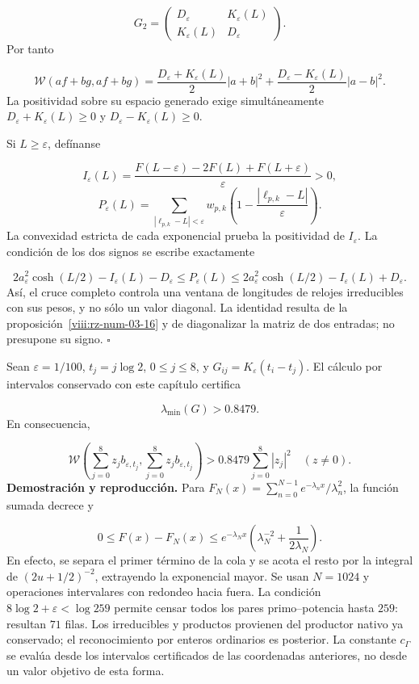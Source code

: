 \[
G_2=\begin{pmatrix}D_\varepsilon&K_\varepsilon(L)\\
K_\varepsilon(L)&D_\varepsilon\end{pmatrix}.
\]
Por tanto

\[
\mathscr W(af+bg,af+bg)=
\frac{D_\varepsilon+K_\varepsilon(L)}2|a+b|^2
+\frac{D_\varepsilon-K_\varepsilon(L)}2|a-b|^2.
\]
La positividad sobre su espacio generado exige simultáneamente \(D_\varepsilon+K_\varepsilon(L)\geq0\) y \(D_\varepsilon-K_\varepsilon(L)\geq0\).

Si \(L\geq\varepsilon\), defínanse

\[
I_\varepsilon(L)=
\frac{F(L-\varepsilon)-2F(L)+F(L+\varepsilon)}{\varepsilon}>0,
\]
\[
P_\varepsilon(L)=
\sum_{|\ell_{p,k}-L|<\varepsilon}w_{p,k}
\left(1-\frac{|\ell_{p,k}-L|}{\varepsilon}\right).
\]
La convexidad estricta de cada exponencial prueba la positividad de \(I_\varepsilon\). La condición de los dos signos se escribe exactamente

\[
2a_\varepsilon^2\cosh(L/2)-I_\varepsilon(L)-D_\varepsilon
\leq P_\varepsilon(L)
\leq
2a_\varepsilon^2\cosh(L/2)-I_\varepsilon(L)+D_\varepsilon.
\]
Así, el cruce completo controla una ventana de longitudes de relojes irreducibles con sus pesos, y no sólo un valor diagonal. La identidad resulta de la proposición~\ref{viii:rz-num-03-16} y de diagonalizar la matriz de dos entradas; no presupone su signo. \hfill\(\square\)

Sean \(\varepsilon=1/100\), \(t_j=j\log2\), \(0\leq j\leq8\), y \(G_{ij}=K_\varepsilon(t_i-t_j)\). El cálculo por intervalos conservado con este capítulo certifica

\[
\lambda_{\min}(G)>0.8479.
\]
En consecuencia,

\[
\mathscr W\left(\sum_{j=0}^8z_jb_{\varepsilon,t_j},
\sum_{j=0}^8z_jb_{\varepsilon,t_j}\right)
>0.8479\sum_{j=0}^8|z_j|^2
\quad(z\neq0).
\]
\textbf{Demostración y reproducción.} Para \(F_N(x)=\sum_{n=0}^{N-1}e^{-\lambda_nx}/\lambda_n^2\), la función sumada decrece y

\[
0\leq F(x)-F_N(x)
\leq e^{-\lambda_Nx}
\left(\lambda_N^{-2}+\frac1{2\lambda_N}\right).
\]
En efecto, se separa el primer término de la cola y se acota el resto por la integral de \((2u+1/2)^{-2}\), extrayendo la exponencial mayor. Se usan \(N=1024\) y operaciones intervalares con redondeo hacia fuera. La condición \(8\log2+\varepsilon<\log259\) permite censar todos los pares primo–potencia hasta \(259\): resultan \(71\) filas. Los irreducibles y productos provienen del productor nativo ya conservado; el reconocimiento por enteros ordinarios es posterior. La constante \(c_\Gamma\) se evalúa desde los intervalos certificados de las coordenadas anteriores, no desde un valor objetivo de esta forma.

